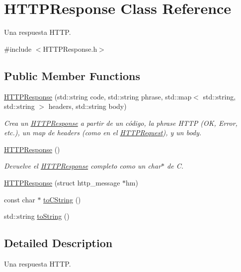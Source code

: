 \hypertarget{class_h_t_t_p_response}{}\section{H\+T\+T\+P\+Response Class Reference}
\label{class_h_t_t_p_response}


Una respuesta H\+T\+T\+P.  




{\ttfamily \#include $<$H\+T\+T\+P\+Response.\+h$>$}

\subsection*{Public Member Functions}
\begin{DoxyCompactItemize}
\item 
\hyperlink{class_h_t_t_p_response_a80cb475ed37530e4005dc1a2b1849fe3}{H\+T\+T\+P\+Response} (std\+::string code, std\+::string phrase, std\+::map$<$ std\+::string, std\+::string $>$ headers, std\+::string body)
\begin{DoxyCompactList}\small\item\em Crea un \hyperlink{class_h_t_t_p_response}{H\+T\+T\+P\+Response} a partir de un código, la phrase H\+T\+T\+P (O\+K, Error, etc.), un map de headers (como en el \hyperlink{class_h_t_t_p_request}{H\+T\+T\+P\+Request}), y un body. \end{DoxyCompactList}\item 
\hyperlink{class_h_t_t_p_response_ac5a0ae54aa75da2db7fcdc69751128ba}{H\+T\+T\+P\+Response} ()
\begin{DoxyCompactList}\small\item\em Devuelve el \hyperlink{class_h_t_t_p_response}{H\+T\+T\+P\+Response} completo como un char$\ast$ de C. \end{DoxyCompactList}\item 
\hyperlink{class_h_t_t_p_response_a9f5334bb8540b212198e35f63eb0c6a7}{H\+T\+T\+P\+Response} (struct http\+\_\+message $\ast$hm)
\item 
const char $\ast$ \hyperlink{class_h_t_t_p_response_acf3cc435114cf49b8531afa7c1fc5d4a}{to\+C\+String} ()
\item 
std\+::string \hyperlink{class_h_t_t_p_response_a64720f0ed87399652cdef947dc6877ac}{to\+String} ()
\end{DoxyCompactItemize}


\subsection{Detailed Description}
Una respuesta H\+T\+T\+P. 


